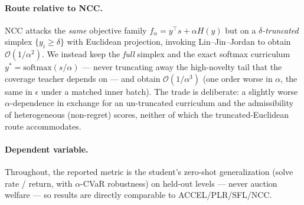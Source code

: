 \documentclass[11pt]{article}
\newcommand{\dist}{y}              %
\newcommand{\score}{s}             %
\newcommand{\entropy}{H}
\begin{document}
\paragraph{Route relative to NCC.}
NCC attacks the \emph{same} objective family $f_\alpha=\dist^{\top}\score+\alpha\entropy(\dist)$ but on a \emph{$\delta$-truncated} simplex $\{\dist_i\ge\delta\}$ with Euclidean projection, invoking Lin--Jin--Jordan to obtain $\mathcal{O}(1/\alpha^2)$. We instead keep the \emph{full} simplex and the exact softmax curriculum $\dist^{*}=\mathrm{softmax}(\score/\alpha)$ --- never truncating away the high-novelty tail that the coverage teacher depends on --- and obtain $\mathcal{O}(1/\alpha^3)$ (one order worse in $\alpha$, the same in $\epsilon$ under a matched inner batch). The trade is deliberate: a slightly worse $\alpha$-dependence in exchange for an un-truncated curriculum and the admissibility of heterogeneous (non-regret) scores, neither of which the truncated-Euclidean route accommodates.

\paragraph{Dependent variable.}
Throughout, the reported metric is the student's zero-shot generalization (solve rate / return, with $\alpha$-CVaR robustness) on held-out levels --- never auction welfare --- so results are directly comparable to ACCEL/PLR/SFL/NCC.

\end{document}
